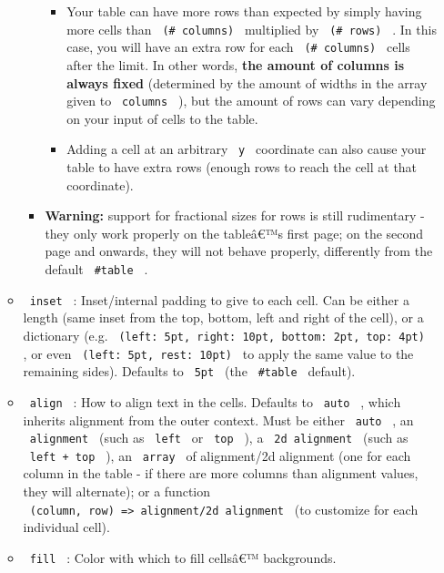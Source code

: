 \begin{enumerate}
\begin{itemize}
\begin{itemize}
      \begin{itemize}
      \tightlist
      \item
        Your table can have more rows than expected by simply having
        more cells than \texttt{\ (\#\ columns)\ } multiplied by
        \texttt{\ (\#\ rows)\ } . In this case, you will have an extra
        row for each \texttt{\ (\#\ columns)\ } cells after the limit.
        In other words, \textbf{the amount of columns is always fixed}
        (determined by the amount of widths in the array given to
        \texttt{\ columns\ } ), but the amount of rows can vary
        depending on your input of cells to the table.
      \item
        Adding a cell at an arbitrary \texttt{\ y\ } coordinate can also
        cause your table to have extra rows (enough rows to reach the
        cell at that coordinate).
      \end{itemize}
    \item
      \textbf{Warning:} support for fractional sizes for rows is still
      rudimentary - they only work properly on the tableâ€™s first page;
      on the second page and onwards, they will not behave properly,
      differently from the default \texttt{\ \#table\ } .
    \end{itemize}
  \item
    \texttt{\ inset\ } : Inset/internal padding to give to each cell.
    Can be either a length (same inset from the top, bottom, left and
    right of the cell), or a dictionary (e.g.
    \texttt{\ (left:\ 5pt,\ right:\ 10pt,\ bottom:\ 2pt,\ top:\ 4pt)\ }
    , or even \texttt{\ (left:\ 5pt,\ rest:\ 10pt)\ } to apply the same
    value to the remaining sides). Defaults to \texttt{\ 5pt\ } (the
    \texttt{\ \#table\ } default).
  \item
    \texttt{\ align\ } : How to align text in the cells. Defaults to
    \texttt{\ auto\ } , which inherits alignment from the outer context.
    Must be either \texttt{\ auto\ } , an \texttt{\ alignment\ } (such
    as \texttt{\ left\ } or \texttt{\ top\ } ), a
    \texttt{\ 2d\ alignment\ } (such as \texttt{\ left\ +\ top\ } ), an
    \texttt{\ array\ } of alignment/2d alignment (one for each column in
    the table - if there are more columns than alignment values, they
    will alternate); or a function
    \texttt{\ (column,\ row)\ =\textgreater{}\ alignment/2d\ alignment\ }
    (to customize for each individual cell).
  \item
    \texttt{\ fill\ } : Color with which to fill cellsâ€™ backgrounds.

\end{itemize}
\end{enumerate}
